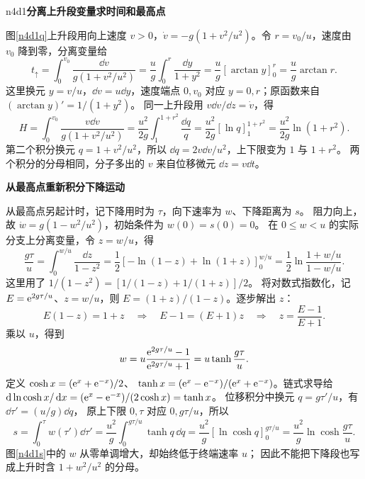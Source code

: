 \LectureAnswerSection

\begin{drillsolution}{n4d1}\textbf{分离上升段变量求时间和最高点}\par\nobreak
图\ref{n4d1q}上升段用向上速度 $v>0$，$\dot v=-g(1+v^2/u^2)$。令 $r=v_0/u$，速度由 $v_0$ 降到零，分离变量给
\[
t_\uparrow=\int_0^{v_0}\frac{\dd v}{g(1+v^2/u^2)}
=\frac ug\int_0^r\frac{\dd y}{1+y^2}
=\frac ug[\arctan y]_0^r=\frac ug\arctan r.
\]
这里换元 $y=v/u$，$\dd v=u\dd y$，速度端点 $0,v_0$ 对应 $y=0,r$；原函数来自 $(\arctan y)'=1/(1+y^2)$。
同一上升段用 $v\dd v/\dd z=\dot v$，得
\[
H=\int_0^{v_0}\frac{v\dd v}{g(1+v^2/u^2)}
=\frac{u^2}{2g}\int_1^{1+r^2}\frac{\dd q}{q}
=\frac{u^2}{2g}[\ln q]_1^{1+r^2}
=\frac{u^2}{2g}\ln(1+r^2).
\]
第二个积分换元 $q=1+v^2/u^2$，所以 $\dd q=2v\dd v/u^2$，上下限变为 $1$ 与 $1+r^2$。
两个积分的分母相同，分子多出的 $v$ 来自位移微元 $\dd z=v\dd t$。



\par\medskip{}\noindent\textbf{从最高点重新积分下降运动}\par\nobreak
从最高点另起计时，记下降用时为 $\tau$，向下速率为 $w$、下降距离为 $s$。
阻力向上，故 $\dot w=g(1-w^2/u^2)$，初始条件为 $w(0)=s(0)=0$。
在 $0\le w<u$ 的实际分支上分离变量，令 $z=w/u$，得
\[
 \frac{g\tau}{u}=\int_0^{w/u}\frac{\dd z}{1-z^2}
 =\frac12[-\ln(1-z)+\ln(1+z)]_0^{w/u}
 =\frac12\ln\frac{1+w/u}{1-w/u}.
\]
这里用了 $1/(1-z^2)=[1/(1-z)+1/(1+z)]/2$。
将对数式指数化，记 $E=\mathrm e^{2g\tau/u}$、$z=w/u$，则 $E=(1+z)/(1-z)$。逐步解出 $z$：
\[
 E(1-z)=1+z
 \quad\Longrightarrow\quad E-1=(E+1)z
 \quad\Longrightarrow\quad z=\frac{E-1}{E+1}.
\]
乘以 $u$，得到
\[
 w=u\frac{\mathrm e^{2g\tau/u}-1}{\mathrm e^{2g\tau/u}+1}
   =u\tanh\frac{g\tau}{u}.
\]
定义 $\cosh x=(\mathrm e^x+\mathrm e^{-x})/2$、
$\tanh x=(\mathrm e^x-\mathrm e^{-x})/(\mathrm e^x+\mathrm e^{-x})$。链式求导给
$\mathop{}\!\mathrm d\ln\cosh x/\mathop{}\!\mathrm d x=(\mathrm e^x-\mathrm e^{-x})/(2\cosh x)=\tanh x$。
位移积分中换元 $q=g\tau'/u$，有 $\dd\tau'=(u/g)\dd q$，
原上下限 $0,\tau$ 对应 $0,g\tau/u$，所以
\[
 s=\int_0^\tau w(\tau')\dd\tau'
   =\frac{u^2}{g}\int_0^{g\tau/u}\tanh q\,\dd q
   =\frac{u^2}{g}[\ln\cosh q]_0^{g\tau/u}
   =\frac{u^2}{g}\ln\cosh\frac{g\tau}{u}.
\]
图\ref{n4d1s}中的 $w$ 从零单调增大，却始终低于终端速率 $u$；
因此不能把下降段也写成上升时含 $1+w^2/u^2$ 的分母。


\end{drillsolution}
